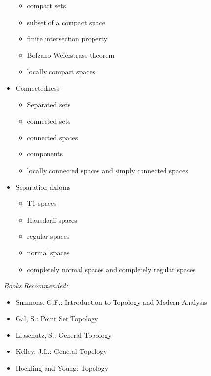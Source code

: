 \documentclass[../main-sheet.tex]{subfiles}
\begin{document}
\begin{itemize}
\begin{itemize}
        \item compact sets
        \item subset of a compact space
        \item finite intersection property
        \item Bolzano-Weierstrass theorem
        \item locally compact spaces
    \end{itemize}
    \item  Connectedness
    \begin{itemize}
        \item Separated sets
        \item connected sets
        \item connected spaces
        \item components
        \item locally connected spaces and simply connected spaces
    \end{itemize}
    \item  Separation axioms
    \begin{itemize}
        \item T1-spaces
        \item Hausdorff spaces
        \item regular spaces
        \item normal spaces
        \item completely normal spaces and completely regular spaces
    \end{itemize}
\end{itemize}
    
    
\emph{Books Recommended:}
\begin{itemize}
    \item Simmons, G.F.: Introduction to Topology and Modern Analysis
    \item Gal, S.: Point Set Topology
    \item Lipschutz, S.: General Topology
    \item Kelley, J.L.: General Topology
    \item  Hockling and Young: Topology
\end{itemize}
\end{document}
